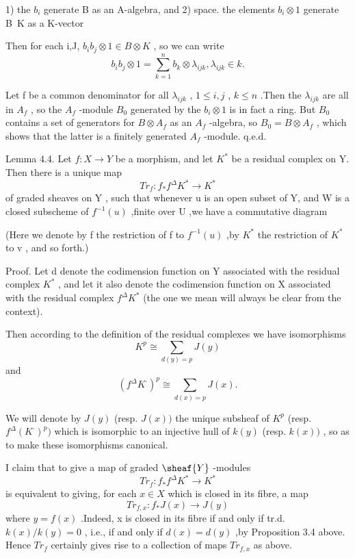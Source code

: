 \documentclass[12pt]{book}
\begin{document}
\setcounter{page}{342}
1) the \(b_{i}\) generate
B as an A-algebra, and
2) space. the elements \(b_{i} \otimes 1\) generate B~K as a K-vector

Then for each i,J, \(b_{i} b_{j} \otimes 1 \in B \otimes K\) , so we can write
\[b_{i} b_{j} \otimes 1=\sum_{k=1}^{n} b_{k} \otimes \lambda_{i j k}, \lambda_{i j k} \in k .\]

Let f be a common denominator for all \(\lambda_{i j k}\) , \(1 ≤i, j\) , \(k ≤n\) .Then the \(\lambda_{i j k}\) are all in \(A_{f}\) , so the \(A_{f}\) -module \(B_{0}\) generated by the \(b_{i} \otimes 1\) is in fact a ring. But \(B_{0}\) contains a set of generators for \(B \otimes A_{f}\) as an \(A_{f}\) -algebra, so \(B_{0}=B \otimes A_{f}\) , which shows that the latter is a finitely generated \(A_{f}\) -module.
q.e.d.

\setcounter{page}{343}
Lemma 4.4. Let \(f: X \to Y\) be a morphism, and let \(K^{*}\) be a residual complex on Y. Then there is a unique map
\[Tr_{f}: f_{*} f^{\Delta} K^{*} \to K^{*}\]
of graded sheaves on Y , such that whenever u is an open subset of Y, and W is a closed subscheme of \(f^{-1}(u)\) ,finite over U ,we have a commutative diagram

(Here we denote by f the restriction of f to \(f^{-1}(u)\) ,by \(K^{*}\) the restriction of \(K^{*}\) to v , and so forth.)

\setcounter{page}{344}
Proof. Let d denote the codimension function on Y associated with the residual complex \(K^{*}\) , and let it also denote the codimension function on X associated with the residual complex \(f^{\Delta} K^{*}\) (the one we mean will always be clear from the context).

Then according to the definition of the residual complexes we have isomorphisms
\[K^{p} \cong \sum_{d(y)=p} J(y)\]
and
\[\left(f^{\Delta} K^{\cdot}\right)^{p} \cong \sum_{d(x)=p} J(x) .\]

We will denote by \(J(y)\) (resp. \(J(x))\) the unique subsheaf of \(K^{p}\)
(resp. \(f^{\Delta}(K^{\cdot})^{p})\) which is isomorphic to an injective hull of \(k(y)\) (resp. \(k(x))\) , so as to make these isomorphisms canonical.

\setcounter{page}{345}
I claim that to give a map of graded \(\sheaf{Y}\) -modules
\[Tr_{f}: f_{*} f^{\Delta} K^{*} \to K^{*}\]
is equivalent to giving, for each \(x \in X\) which is closed in its fibre, a map
\[Tr_{f, x}: f_{*} J(x) \to J(y)\]
where \(y=f(x)\) .Indeed, x is closed in its fibre if and only if tr.d. \(k(x) / k(y)=0\) , i.e., if and only if \(d(x)=d(y)\) ,by
Proposition 3.4 above. Hence \(Tr_{f}\) certainly gives rise to a collection of maps \(Tr_{f, x}\) as above.
\end{document}
